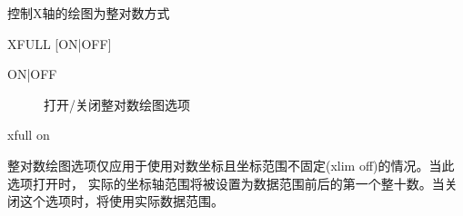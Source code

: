 \label{cmd:xfull}

控制X轴的绘图为整对数方式

\begin{SACSTX}
XFULL [ON|OFF]
\end{SACSTX}

\begin{description}
\item [ON|OFF] 打开/关闭整对数绘图选项
\end{description}

\begin{SACDFT}
xfull on
\end{SACDFT}

整对数绘图选项仅应用于使用对数坐标且坐标范围不固定(xlim off)的情况。当此选项打开时，
实际的坐标轴范围将被设置为数据范围前后的第一个整十数。当关闭这个选项时，将使用实际数据范围。

